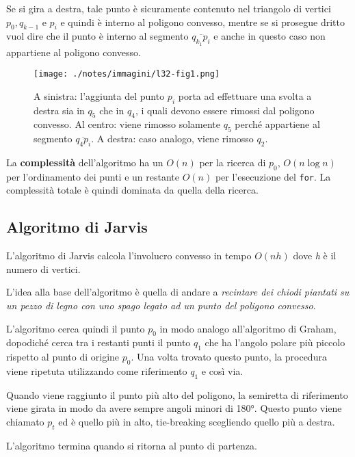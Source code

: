 Se si gira a destra, tale punto è sicuramente contenuto nel triangolo di vertici $p_0, q_{k-1} \text{ e } p_i$ e quindi è interno al poligono convesso, mentre se si prosegue dritto vuol dire che il punto è interno al segmento $\overline{q_{k_1}p_i}$ e anche in questo caso non appartiene al poligono convesso.


\begin{figure}[htbp]
\centering
\texttt{[image: ./notes/immagini/l32-fig1.png]}
\caption{A sinistra: l'aggiunta del punto $p_i$ porta ad effettuare una svolta a destra sia in $q_5$ che in $ q_4 $, i quali devono essere rimossi dal poligono convesso. Al centro: viene rimosso solamente $ q_5 $ perché appartiene al segmento $\overline{q_4p_i}$. A destra: caso analogo, viene rimosso $q_2$.}
\end{figure}

La \textbf{complessità} dell'algoritmo ha un $O(n)$ per la ricerca di $p_0$, $O(n \log n)$ per l'ordinamento dei punti e un restante $O(n)$ per l'esecuzione del \texttt{for}. 
La complessità totale è quindi dominata da quella della ricerca.

\subsection{Algoritmo di Jarvis}\label{algoritmo-di-jarvis}

L'algoritmo di Jarvis calcola l'involucro convesso in tempo $O(nh)$ dove \emph{h} è il numero di vertici.

L'idea alla base dell'algoritmo è quella di andare a \emph{recintare dei chiodi piantati su un pezzo di legno con uno spago legato ad un punto del poligono convesso}.

L'algoritmo cerca quindi il punto $p_0$ in modo analogo all'algoritmo di Graham, dopodiché cerca tra i restanti punti il punto $q_1$ che ha l'angolo polare più piccolo rispetto al punto di origine $p_0$. 
Una volta trovato questo punto, la procedura viene ripetuta utilizzando come riferimento $q_1$ e così via. 

Quando viene raggiunto il punto più alto del poligono, la semiretta di riferimento viene girata in modo da avere sempre angoli minori di 180°. 
Questo punto viene chiamato $p_t$ ed è quello più in alto, tie-breaking scegliendo quello più a destra.

L'algoritmo termina quando si ritorna al punto di partenza.

